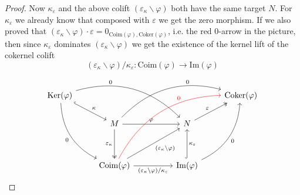 \begin{proof}
Now $\kappa_{\varepsilon}$ and the above colift $(\varepsilon_{\kappa}\backslash \varphi)$ both have the same target $N$.
For $\kappa_{\varepsilon}$ we already know that composed with $\varepsilon$ we get the zero morphism.
If we also proved that
$(\varepsilon_{\kappa}\backslash \varphi) \cdot \varepsilon = 0_{\mathrm{Coim}(\varphi),\mathrm{Coker}(\varphi)}$, i.e.
the red $0$-arrow in the picture, then since $\kappa_{\varepsilon}$ dominates $(\varepsilon_{\kappa}\backslash \varphi)$
we get the existence of the kernel lift of the cokernel colift
\[
(\varepsilon_{\kappa}\backslash \varphi) / \kappa_{\varepsilon} : \mathrm{Coim}(\varphi) \rightarrow \mathrm{Im}(\varphi)
\]

\[
\begin{tikzcd}
\mathrm{Ker}(\varphi) \arrow[rd, "\kappa", hook] \arrow[rddd, "0"', bend right] \arrow[rrrd, "0", pos=0.3, bend left] &                                                                                                                                                                                             &  &                                                                                               & \mathrm{Coker}(\varphi) \\
                                                                                                             & M \arrow[rrru, "0", pos=0.7, bend left] \arrow[rr, "\varphi"] \arrow[dd, "\varepsilon_{\kappa}"', two heads]                                                                                         &  & N \arrow[ru, "\varepsilon", two heads]                                                        &                         \\
                                                                                                             &                                                                                                                                                                                             &  &                                                                                               &                         \\
                                                                                                             & \mathrm{Coim}(\varphi) \arrow[rruu, "(\varepsilon_{\kappa}\backslash \varphi)"'] \arrow[rr, "(\varepsilon_{\kappa}\backslash\varphi)/\kappa_{\varepsilon}"'] \arrow[rrruuu, "0", pos=0.7, color=red, bend left] &  & \mathrm{Im}(\varphi) \arrow[uu, "\kappa_{\varepsilon}"', hook] \arrow[ruuu, "0"', bend right] &                        
\end{tikzcd}
\]


\end{proof}
